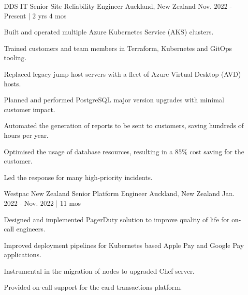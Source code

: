 


\begin{cventries}


\cventry
{DDS IT} %
{Senior Site Reliability Engineer} %
{Auckland, New Zealand} %
{Nov. 2022 - Present | 2 yrs 4 mos} %
{ %
\begin{cvitems}
  \item {Built and operated multiple Azure Kubernetes Service (AKS) clusters.}
  \item {Trained customers and team members in Terraform, Kubernetes and GitOps tooling.}
  \item {Replaced legacy jump host servers with a fleet of Azure Virtual Desktop (AVD) hosts.}
  \item {Planned and performed PostgreSQL major version upgrades with minimal customer impact.}
  \item {Automated the generation of reports to be sent to customers, saving hundreds of hours per year.}
  \item {Optimised the usage of database resources, resulting in a 85\% cost saving for the customer.}
  \item {Led the response for many high-priority incidents.}
  \end{cvitems}
}

\cventry
{Westpac New Zealand} %
{Senior Platform Engineer} %
{Auckland, New Zealand} %
{Jan. 2022 - Nov. 2022 | 11 mos} %
{ %
\begin{cvitems}
\item {Designed and implemented PagerDuty solution to improve quality of life for on-call engineers.}
\item {Improved deployment pipelines for Kubernetes based Apple Pay and Google Pay applications.}
\item {Instrumental in the migration of nodes to upgraded Chef server.}
\item {Provided on-call support for the card transactions platform.}
\end{cvitems}
}


\end{cventries}
